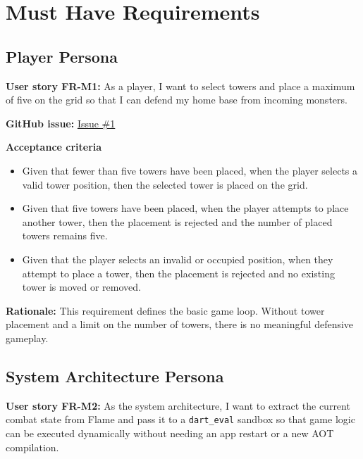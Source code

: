 \documentclass[12pt,a4paper]{article}
\begin{document}
\section{Must Have Requirements}
\label{sec:must-have}

\subsection{Player Persona}

\textbf{User story FR-M1:} As a player, I want to select towers and place a maximum
of five on the grid so that I can defend my home base from incoming monsters.

\textbf{GitHub issue:} \href{https://github.com/nexuma/tower-defence-final-project/issues/1}{Issue \#1}

\par\medskip
\noindent\textbf{Acceptance criteria}
\par\smallskip
\begin{itemize}[leftmargin=1.5em,itemsep=0.35em,topsep=0.2em]
    \item Given that fewer than five towers have been placed, when the player
    selects a valid tower position, then the selected tower is placed on the
    grid.
    \item Given that five towers have been placed, when the player attempts to
    place another tower, then the placement is rejected and the number of
    placed towers remains five.
    \item Given that the player selects an invalid or occupied position, when
    they attempt to place a tower, then the placement is rejected and no
    existing tower is moved or removed.
\end{itemize}

\par\medskip
\textbf{Rationale:} This requirement defines the basic game loop. Without
tower placement and a limit on the number of towers, there is no meaningful
defensive gameplay.

\subsection{System Architecture Persona}

\textbf{User story FR-M2:} As the system architecture, I want to extract the current
combat state from Flame and pass it to a \texttt{dart\_eval} sandbox so that
game logic can be executed dynamically without needing an app restart or a new
AOT compilation.
\end{document}
